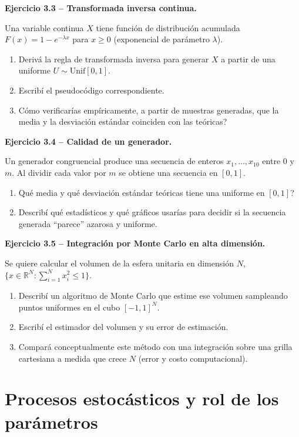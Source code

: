 \documentclass[11pt,a4paper]{article}
\newcommand{\ejercicio}[1]{\par\medskip\noindent\textbf{#1}\par\nopagebreak\smallskip}
\begin{document}
\ejercicio{Ejercicio 3.3 -- Transformada inversa continua.}
Una variable continua $X$ tiene funci\'on de distribuci\'on acumulada
$F(x)=1-e^{-\lambda x}$ para $x\ge 0$ (exponencial de par\'ametro $\lambda$).
\begin{enumerate}[label=(\alph*)]
  \item Deriv\'a la regla de transformada inversa para generar $X$ a partir de una
        uniforme $U\sim\mathrm{Unif}[0,1]$.
  \item Escrib\'i el pseudoc\'odigo correspondiente.
  \item \textquestiondown{}C\'omo verificar\'ias emp\'iricamente, a partir de muestras generadas, que la
        media y la desviaci\'on est\'andar coinciden con las te\'oricas?
\end{enumerate}

\ejercicio{Ejercicio 3.4 -- Calidad de un generador.}
Un generador congruencial produce una secuencia de enteros $x_1,\dots,x_{10}$
entre $0$ y $m$. Al dividir cada valor por $m$ se obtiene una secuencia en $[0,1]$.
\begin{enumerate}[label=(\alph*)]
  \item \textquestiondown{}Qu\'e media y qu\'e desviaci\'on est\'andar te\'oricas tiene una uniforme en
        $[0,1]$?
  \item Describ\'i qu\'e estad\'isticos y qu\'e gr\'aficos usar\'ias para decidir si la
        secuencia generada ``parece'' azarosa y uniforme.
\end{enumerate}

\ejercicio{Ejercicio 3.5 -- Integraci\'on por Monte Carlo en alta dimensi\'on.}
Se quiere calcular el volumen de la esfera unitaria en dimensi\'on $N$,
$\{x\in\mathbb{R}^N : \sum_{i=1}^N x_i^2 \le 1\}$.
\begin{enumerate}[label=(\alph*)]
  \item Describ\'i un algoritmo de Monte Carlo que estime ese volumen sampleando
        puntos uniformes en el cubo $[-1,1]^N$.
  \item Escrib\'i el estimador del volumen y su error de estimaci\'on.
  \item Compar\'a conceptualmente este m\'etodo con una integraci\'on sobre una grilla
        cartesiana a medida que crece $N$ (error y costo computacional).
\end{enumerate}

\section{Procesos estoc\'asticos y rol de los par\'ametros}
\end{document}
